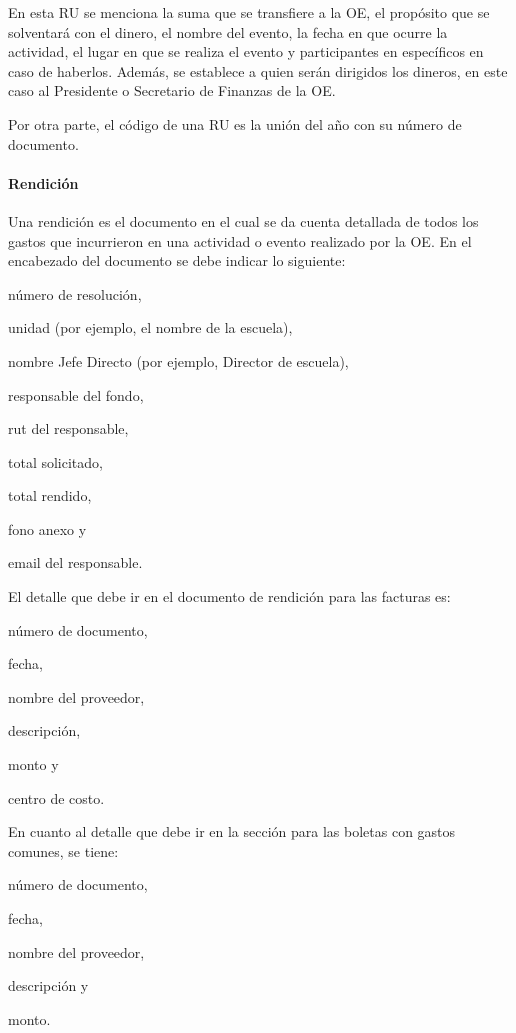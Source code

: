   En esta RU se menciona la suma que se transfiere a la OE, el propósito que se solventará con el dinero, el nombre del evento, la fecha en que ocurre la actividad, el lugar en que se realiza el evento y participantes en específicos en caso de haberlos. Además, se establece a quien serán dirigidos los dineros, en este caso al Presidente o Secretario de Finanzas de la OE.

  Por otra parte, el código de una RU es la unión del año con su número de documento. 

  \paragraph{Rendición}

  Una rendición es el documento en el cual se da cuenta detallada de todos los gastos que incurrieron en una actividad o evento realizado por la OE. En el encabezado del documento se debe indicar lo siguiente:
  \begin{enumerate*}[label=(\roman*)]
    \item número de resolución,
    \item unidad (por ejemplo, el nombre de la escuela),
    \item nombre Jefe Directo (por ejemplo, Director de escuela),
    \item responsable del fondo,
    \item rut del responsable,
    \item total solicitado,
    \item total rendido,
    \item fono anexo y
    \item email del responsable.
  \end{enumerate*}
  
  El detalle que debe ir en el documento de rendición para las facturas es:
  \begin{enumerate*}[label=(\roman*)]
    \item número de documento,
    \item fecha,
    \item nombre del proveedor,
    \item descripción,
    \item monto y
    \item centro de costo.
  \end{enumerate*}
  
  En cuanto al detalle que debe ir en la sección para las boletas con gastos comunes, se tiene:
  \begin{enumerate*}[label=(\roman*)]
    \item número de documento,
    \item fecha,
    \item nombre del proveedor,
    \item descripción y
    \item monto.
  \end{enumerate*}
  
